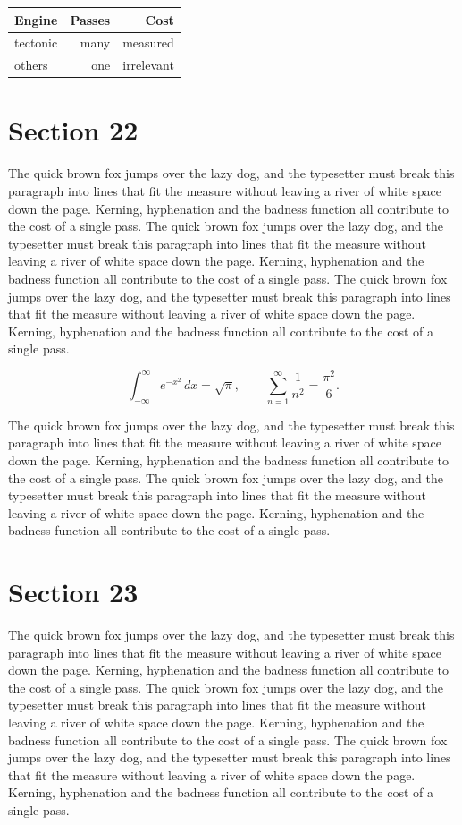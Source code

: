 \documentclass{article}
\begin{document}
\begin{center}
\begin{tabular}{lrr}
\toprule
Engine & Passes & Cost \\
\midrule
tectonic & many & measured \\
others & one & irrelevant \\
\bottomrule
\end{tabular}
\end{center}

\section{Section 22}
The quick brown fox jumps over the lazy dog, and the typesetter must break this paragraph into lines that fit the measure without leaving a river of white space down the page. Kerning, hyphenation and the badness function all contribute to the cost of a single pass. The quick brown fox jumps over the lazy dog, and the typesetter must break this paragraph into lines that fit the measure without leaving a river of white space down the page. Kerning, hyphenation and the badness function all contribute to the cost of a single pass. The quick brown fox jumps over the lazy dog, and the typesetter must break this paragraph into lines that fit the measure without leaving a river of white space down the page. Kerning, hyphenation and the badness function all contribute to the cost of a single pass. 

\begin{equation}
\int_{-\infty}^{\infty} e^{-x^{2}}\,dx = \sqrt{\pi}, \qquad
\sum_{n=1}^{\infty} \frac{1}{n^{2}} = \frac{\pi^{2}}{6}.
\end{equation}

The quick brown fox jumps over the lazy dog, and the typesetter must break this paragraph into lines that fit the measure without leaving a river of white space down the page. Kerning, hyphenation and the badness function all contribute to the cost of a single pass. The quick brown fox jumps over the lazy dog, and the typesetter must break this paragraph into lines that fit the measure without leaving a river of white space down the page. Kerning, hyphenation and the badness function all contribute to the cost of a single pass. 
\section{Section 23}
The quick brown fox jumps over the lazy dog, and the typesetter must break this paragraph into lines that fit the measure without leaving a river of white space down the page. Kerning, hyphenation and the badness function all contribute to the cost of a single pass. The quick brown fox jumps over the lazy dog, and the typesetter must break this paragraph into lines that fit the measure without leaving a river of white space down the page. Kerning, hyphenation and the badness function all contribute to the cost of a single pass. The quick brown fox jumps over the lazy dog, and the typesetter must break this paragraph into lines that fit the measure without leaving a river of white space down the page. Kerning, hyphenation and the badness function all contribute to the cost of a single pass. 
\end{document}
